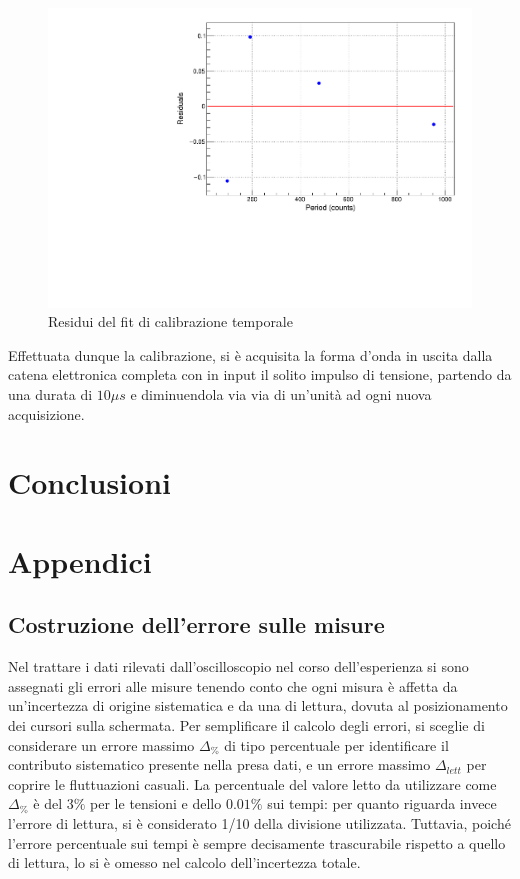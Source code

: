 \documentclass{article}
\begin{document}
\begin{center}
\begin{figure}[H]
\centering
\includegraphics[scale=0.4, angle=0]{calibtempiresidui.pdf}
\caption{Residui del fit di calibrazione temporale}
\label{fig:calibtempiresidui}
\end{figure}
\end{center}


Effettuata dunque la calibrazione, si è acquisita la forma d'onda in uscita dalla catena elettronica completa con in input il solito
impulso di tensione, partendo da una durata di $10 \mu s$ e diminuendola via via di un'unità ad ogni nuova acquisizione.

\section{Conclusioni}

\newpage
\appendix
\section{Appendici}
\label{appendice}
\subsection{Costruzione dell'errore sulle misure}
\label{Calcerr}

Nel trattare i dati rilevati dall'oscilloscopio nel corso dell'esperienza si sono assegnati gli errori alle misure tenendo conto che ogni misura è affetta da un'incertezza di origine sistematica e da una di lettura, dovuta al posizionamento dei cursori sulla schermata. Per semplificare il calcolo degli errori, si sceglie di considerare un errore massimo $\Delta_{\%}$ di tipo percentuale per identificare il contributo sistematico presente nella presa dati, e un errore massimo $\Delta_{lett}$ per coprire le fluttuazioni casuali. La percentuale del valore letto da utilizzare come $\Delta_{\%}$ è del $3\%$ per le tensioni e dello $0.01\%$ sui tempi: per quanto riguarda invece l'errore di lettura, si è considerato 1/10 della divisione utilizzata.
Tuttavia, poiché l'errore percentuale sui tempi è sempre decisamente trascurabile rispetto a quello di lettura, lo si è omesso nel calcolo dell'incertezza totale.
\end{document}
